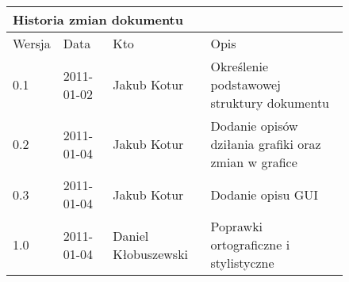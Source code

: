 \begin{figure}[h]
	\centering

\begin{tabular}{|p{}|p{}|p{}|p{}|}
	\hline
	\multicolumn{4}{|l|}{Historia zmian dokumentu} \\
	\hline
	Wersja & Data & Kto & Opis \\
	\hline
	0.1 & 2011-01-02 & Jakub Kotur &
	Określenie podstawowej struktury dokumentu \\
	\hline
	0.2 & 2011-01-04 & Jakub Kotur &
	Dodanie opisów dziłania grafiki oraz zmian w grafice \\
	\hline
	0.3 & 2011-01-04 & Jakub Kotur &
	Dodanie opisu GUI \\
	\hline
	1.0 & 2011-01-04 & Daniel Kłobuszewski &
	Poprawki ortograficzne i stylistyczne \\
	\hline
\end{tabular}

	\label{tab:hist}
\end{figure}

